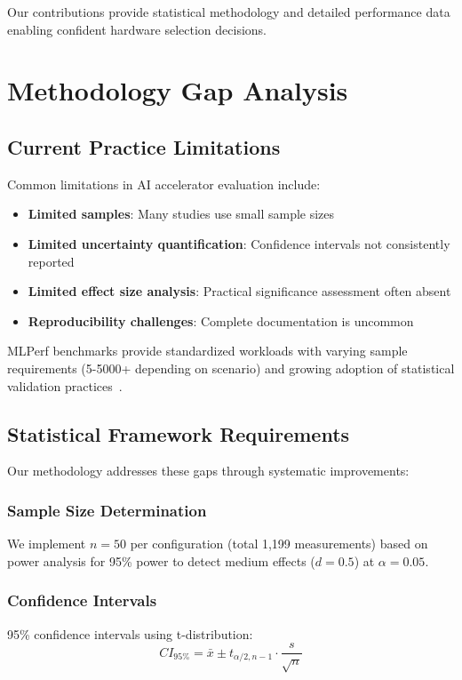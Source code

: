 \documentclass[sigconf]{acmart}
\begin{document}
Our contributions provide statistical methodology and detailed performance data enabling confident hardware selection decisions.

\section{Methodology Gap Analysis}

\subsection{Current Practice Limitations}

Common limitations in AI accelerator evaluation include:

\begin{itemize}
    \item \textbf{Limited samples}: Many studies use small sample sizes
    \item \textbf{Limited uncertainty quantification}: Confidence intervals not consistently reported
    \item \textbf{Limited effect size analysis}: Practical significance assessment often absent
    \item \textbf{Reproducibility challenges}: Complete documentation is uncommon
\end{itemize}

MLPerf benchmarks provide standardized workloads with varying sample requirements (5-5000+ depending on scenario) and growing adoption of statistical validation practices~\cite{isca_benchmark2020}.

\subsection{Statistical Framework Requirements}

Our methodology addresses these gaps through systematic improvements:

\subsubsection{Sample Size Determination}
We implement $n = 50$ per configuration (total 1,199 measurements) based on power analysis for 95\% power to detect medium effects ($d = 0.5$) at $\alpha = 0.05$.

\subsubsection{Confidence Intervals}
95\% confidence intervals using t-distribution:
\begin{equation}
CI_{95\%} = \bar{x} \pm t_{\alpha/2,n-1} \cdot \frac{s}{\sqrt{n}}
\end{equation}
\end{document}
